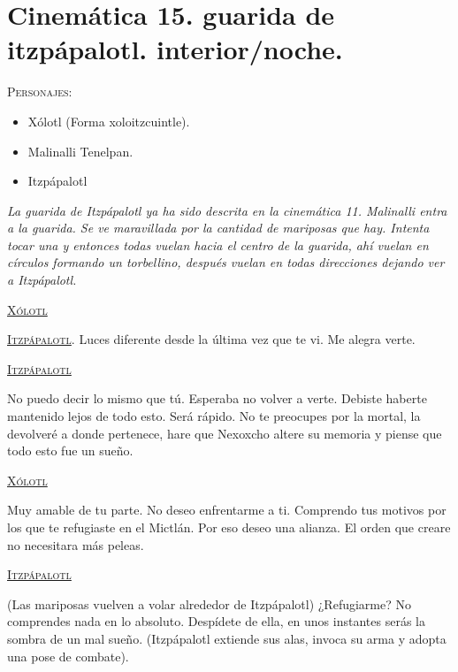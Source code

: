 \section{Cinemática 15. guarida de itzpápalotl. interior/noche.} \label{Cin:Cinematica15}
 \textsc{Personajes}:
 \begin{itemize}
 \item Xólotl (Forma xoloitzcuintle).
 \item Malinalli Tenelpan.
 \item Itzpápalotl
 \end{itemize}
 \textit{La guarida de Itzpápalotl ya ha sido descrita en la cinemática 11. Malinalli entra a la guarida. Se ve maravillada por la cantidad de mariposas que hay. Intenta tocar una y entonces todas vuelan hacia el centro de la guarida, ahí vuelan en círculos formando un torbellino, después vuelan en todas direcciones dejando ver a Itzpápalotl.}
 \begin{center}
 \textsc{\underline{Xólotl}}
 \\
\par
\textsc{\underline{Itzpápalotl}}. Luces diferente desde la última vez que te vi. Me alegra verte.
\\
\par
\textsc{\underline{Itzpápalotl}}
\\
\par
No puedo decir lo mismo que tú. Esperaba no volver a verte. Debiste haberte mantenido lejos de todo esto. Será rápido. No te preocupes por la mortal, la devolveré a donde pertenece, hare que Nexoxcho altere su memoria y piense que todo esto fue un sueño.
\\
\par
\textsc{\underline{Xólotl}}
\\
\par
Muy amable de tu parte. No deseo enfrentarme a ti. Comprendo tus motivos por los que te refugiaste en el Mictlán. Por eso deseo una alianza. El orden que creare no necesitara más peleas.
\\
\par
\textsc{\underline{Itzpápalotl}}
\\
\par
(Las mariposas vuelven a volar alrededor de Itzpápalotl) ¿Refugiarme? No comprendes nada en lo absoluto. Despídete de ella, en unos instantes serás la sombra de un mal sueño.  (Itzpápalotl extiende sus alas, invoca su arma y adopta una pose de combate).
 \end{center}
